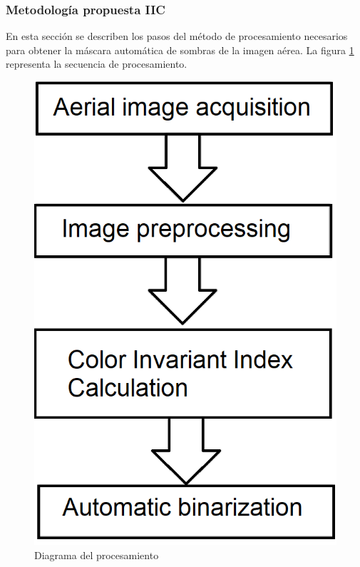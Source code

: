 \subsubsection{Metodología propuesta IIC}
En esta sección se describen los pasos del método de procesamiento necesarios para obtener la máscara automática de sombras de la imagen aérea. La figura \ref{diagrama_procesamiento} representa la secuencia de procesamiento.

\begin{figure}
    \includegraphics[width=\textwidth]{Imagenes/flowchart.png}
     \hfill
     \caption{Diagrama del procesamiento}
    \label{diagrama_procesamiento}
\end{figure}


